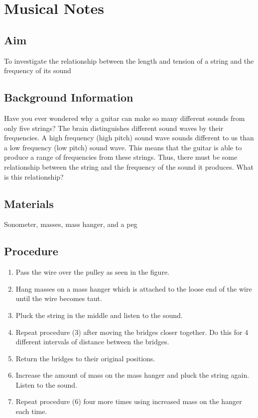 \chapter{Musical Notes}

\section{Aim}
To investigate the relationship between the length and tension of a string and the frequency of its sound

\section{Background Information}
Have you ever wondered why a guitar can make so many different sounds from only five strings? The brain distinguishes different sound waves by their frequencies. A high frequency (high pitch) sound wave sounds different to us than a low frequency (low pitch) sound wave. This means that the guitar is able to produce a range of frequencies from these strings. Thus, there must be some relationship between the string and the frequency of the sound it produces. What is this relationship?

\section{Materials}
Sonometer, masses, mass hanger, and a peg

\section{Procedure}
\begin{enumerate}
\item Pass the wire over the pulley as seen in the figure.
\item Hang masses on a mass hanger which is attached to the loose end of the wire until the wire becomes taut.
\item Pluck the string in the middle and listen to the sound. 
\item Repeat procedure (3) after moving the bridges closer together. Do this for 4 different intervals of distance between the bridges. 
\item Return the bridges to their original positions. 
\item Increase the amount of mass on the mass hanger and pluck the string again. Listen to the sound.
\item Repeat procedure (6) four more times using increased mass on the hanger each time.
\end{enumerate}

